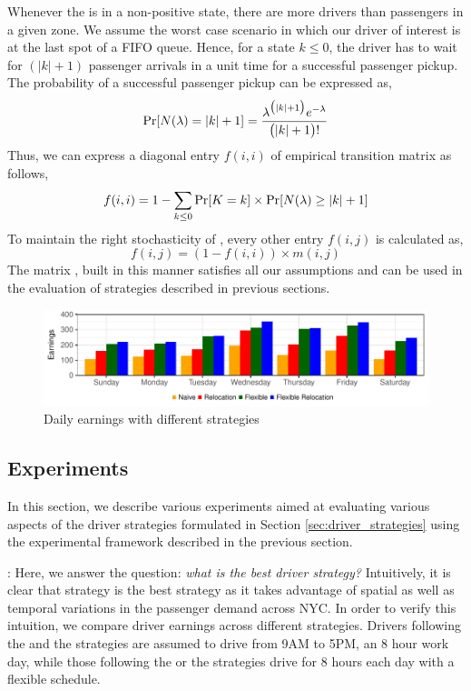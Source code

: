 Whenever the {\markovchain} is in a non-positive state, there are more drivers than passengers in a given zone. We assume the worst case scenario in which our driver of interest is at the last spot of a FIFO queue. Hence, for a state $k \leq 0$, the driver has to wait for $(|k| + 1)$ passenger arrivals in a unit time for a successful passenger pickup. The probability of a successful passenger pickup can be expressed as,
\begin{equation}
\Pr[N(\lambda) = |k| + 1] = \frac{\lambda^{\big(|k|+1\big)} e^{-\lambda}}{\big(|k| + 1\big)!}
\end{equation}
Thus, we can express a diagonal entry $f(i,i)$ of empirical transition matrix as follows,
\begin{equation}
f(i,i) = 1 - \sum_{k \leq 0} \Pr[K = k] \times \Pr[N(\lambda) \geq |k| + 1]
\end{equation}
To maintain the right stochasticity of {\empiricaltransitionmatrix}, every other entry $f(i,j)$ is calculated as,
\begin{equation}
f(i,j) = (1 - f(i,i)) \times m(i,j)
\end{equation}
The matrix {\empiricaltransitionmatrix}, built in this manner satisfies all our assumptions and can be used in the evaluation of strategies described in previous sections.

\begin{figure}
	\centering
	\caption{Daily earnings with different strategies}
	\label{fig:daily_earnings}
	\includegraphics{figures/daily_earnings.pdf}
\end{figure}

\subsection{Experiments}
In this section, we describe various experiments aimed at evaluating various aspects of the driver strategies formulated in Section \ref{sec:driver_strategies} using the experimental framework described in the previous section.

: Here, we answer the question: \textit{what is the best driver strategy?} Intuitively, it is clear that {\relocationflexible} strategy is the best strategy as it takes advantage of spatial as well as temporal variations in the passenger demand across NYC. In order to verify this intuition, we compare driver earnings across different strategies. Drivers following the {\naive} and the {\relocation} strategies are assumed to drive from 9AM to 5PM, an 8 hour work day, while those following the {\flexible} or the {\relocationflexible} strategies drive for 8 hours each day with a flexible schedule.


